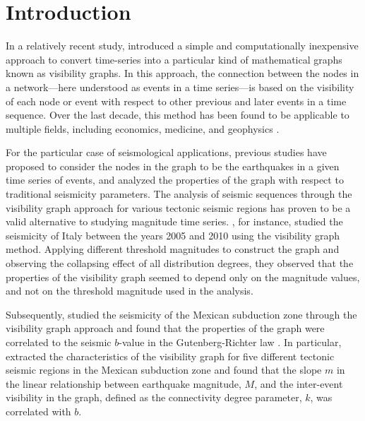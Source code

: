 
\section{Introduction}
\label{sec:introduction}

In a relatively recent study, \citet{Lacasa2008} introduced a simple and computationally inexpensive approach to convert time-series into a particular kind of mathematical graphs known as visibility graphs. In this approach, the connection between the nodes in a network---here understood as events in a time series---is based on the visibility of each node or event with respect to other previous and later events in a time sequence. Over the last decade, this method has been found to be applicable to multiple fields, including economics, medicine, and geophysics \citep[e.g.,][]{Yang_2009_PA, Elsner_2009_GRL, Telesca2012_CSF, Wang2012, Long2013}.

For the particular case of seismological applications, previous studies have proposed to consider the nodes in the graph to be the earthquakes in a given time series of events, and analyzed the properties of the graph with respect to traditional seismicity parameters. The analysis of seismic sequences through the visibility graph approach for various tectonic seismic regions has proven to be a valid alternative to studying magnitude time series. \citet{Telesca2012}, for instance, studied the seismicity of Italy between the years 2005 and 2010 using the visibility graph method. Applying different threshold magnitudes to construct the graph and observing the collapsing effect of all distribution degrees, they observed that the properties of the visibility graph seemed to depend only on the magnitude values, and not on the threshold magnitude used in the analysis. 

Subsequently, \citet{Telesca2013} studied the seismicity of the Mexican subduction zone through the visibility graph approach and found that the properties of the graph were correlated to the seismic $b$-value in the Gutenberg-Richter law \citep{Gutenberg1944}. In particular, \citet{Telesca2013} extracted the characteristics of the visibility graph for five different tectonic seismic regions in the Mexican subduction zone and found that the slope $m$ in the linear relationship between earthquake magnitude, $M$, and the inter-event visibility in the graph, defined as the connectivity degree parameter, $k$, was correlated with $b$.

